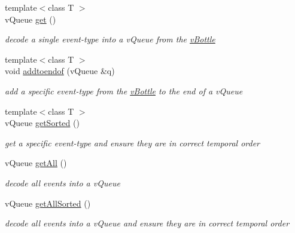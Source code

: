 \begin{DoxyCompactItemize}
$${\footnotesize template$<$class T $>$ }\\v\+Queue \hyperlink{classev_1_1vBottle_a86302277c279a1b02d92f8e12afe6a2c}{get} ()
\begin{DoxyCompactList}\small\item\em decode a single event-\/type into a v\+Queue from the \hyperlink{classev_1_1vBottle}{v\+Bottle} \end{DoxyCompactList}\item 
\mbox{\label{classev_1_1vBottle_a65bf90aec03b80dee45bf834efe3fbfc}} 
{\footnotesize template$<$class T $>$ }\\void \hyperlink{classev_1_1vBottle_a65bf90aec03b80dee45bf834efe3fbfc}{addtoendof} (v\+Queue \&q)
\begin{DoxyCompactList}\small\item\em add a specific event-\/type from the \hyperlink{classev_1_1vBottle}{v\+Bottle} to the end of a v\+Queue \end{DoxyCompactList}\item 
\mbox{\label{classev_1_1vBottle_a27569b9aaa7eb1ff9135d435b841c2de}} 
{\footnotesize template$<$class T $>$ }\\v\+Queue \hyperlink{classev_1_1vBottle_a27569b9aaa7eb1ff9135d435b841c2de}{get\+Sorted} ()
\begin{DoxyCompactList}\small\item\em get a specific event-\/type and ensure they are in correct temporal order \end{DoxyCompactList}\item 
\mbox{\label{classev_1_1vBottle_af2abadf41f73c455dd451e34e9ba3376}} 
v\+Queue \hyperlink{classev_1_1vBottle_af2abadf41f73c455dd451e34e9ba3376}{get\+All} ()
\begin{DoxyCompactList}\small\item\em decode all events into a v\+Queue \end{DoxyCompactList}\item 
\mbox{\label{classev_1_1vBottle_a273cfda65fed58bcf19cedf6652948d9}} 
v\+Queue \hyperlink{classev_1_1vBottle_a273cfda65fed58bcf19cedf6652948d9}{get\+All\+Sorted} ()
\begin{DoxyCompactList}\small\item\em decode all events into a v\+Queue and ensure they are in correct temporal order \end{DoxyCompactList}\end{DoxyCompactItemize}



